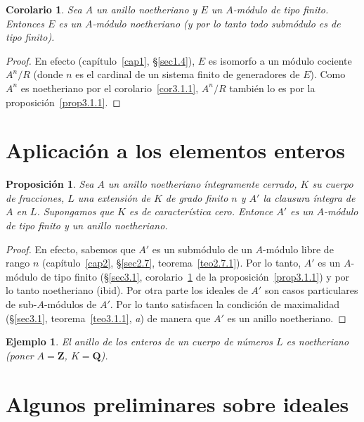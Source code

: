 \documentclass[10pt,oneside,bibtotoc,smallheadings,leqno,a5paper,DIV=12]{scrbook}
\newcommand{\QQ}{\mathbf{Q}}
\newcommand{\ZZ}{\mathbf{Z}}
\numberwithin{equation}{section}
\theoremstyle{defi}
\theoremstyle{enonce}
\newtheorem{proposition}{Proposici\'on}
\newtheorem{corollary}{Corolario}
\theoremstyle{rem}
\newtheorem*{example*}{Ejemplo}
\numberwithin{theorem}{section}
\numberwithin{proposition}{section}
\numberwithin{definition}{section}
\numberwithin{lemma}{section}
\numberwithin{corollary}{section}
\numberwithin{example}{section}
\numberwithin{footnote}{section}%
\begin{document}
\begin{corollary}\label{cor3.1.2}
Sea $A$ un anillo noetheriano y $E$ un $A$-m\'odulo de tipo finito. Entonces $E$ es un
$A$-m\'odulo noetheriano {\upshape(}y por lo tanto todo subm\'odulo es de tipo finito{\upshape).}
\end{corollary}

\begin{proof}
En efecto (cap\'itulo~\ref{cap1}, \S\ref{sec1.4}), $E$ es isomorfo a un m\'odulo cociente $A^{n}/R$ (donde
$n$ es el cardinal de un sistema finito de generadores de $E$). Como $A^{n}$ es noetheriano
por el corolario~\ref{cor3.1.1}, $A^{n}/R$ tambi\'en lo es por la proposici\'on~\ref{prop3.1.1}.
\end{proof}

\section{Aplicaci\'on a los elementos enteros}\label{sec3.2}

\begin{proposition}
Sea $A$ un anillo noetheriano \'integramente cerrado, $K$ su cuerpo de fracciones,
$L$ una extensi\'on de $K$ de grado finito $n$ y $A'$ la clausura \'integra de $A$ en
$L$. Supongamos que $K$ es de caracter\'istica cero. Entonce $A'$ es un $A$-m\'odulo de tipo finito
y un anillo noetheriano.
\end{proposition}

\begin{proof}
En efecto, sabemos que $A'$ es un subm\'odulo de un $A$-m\'odulo libre de rango $n$
(cap\'itulo~\ref{cap2}, \S\ref{sec2.7}, teorema~\ref{teo2.7.1}). Por lo tanto, $A'$ es un $A$-m\'odulo de tipo finito
(\S\ref{sec3.1}, corolario~\ref{cor3.1.2} de la proposici\'on~\ref{prop3.1.1}) y por lo tanto noetheriano (ibid). Por otra parte los ideales
de $A'$ son casos particulares de sub-$A$-m\'odulos de $A'$. Por lo tanto satisfacen la condici\'on
de maximalidad (\S\ref{sec3.1}, teorema~\ref{teo3.1.1}, {\itshape a}) de manera que $A'$ es un anillo noetheriano.
\end{proof}

\begin{example*}
El anillo de los enteros de un cuerpo de n\'umeros $L$ es {\em noetheriano} (poner $A = \ZZ$,
$K = \QQ$).
\end{example*}

\section{Algunos preliminares sobre ideales}\label{sec3.3}
\end{document}

